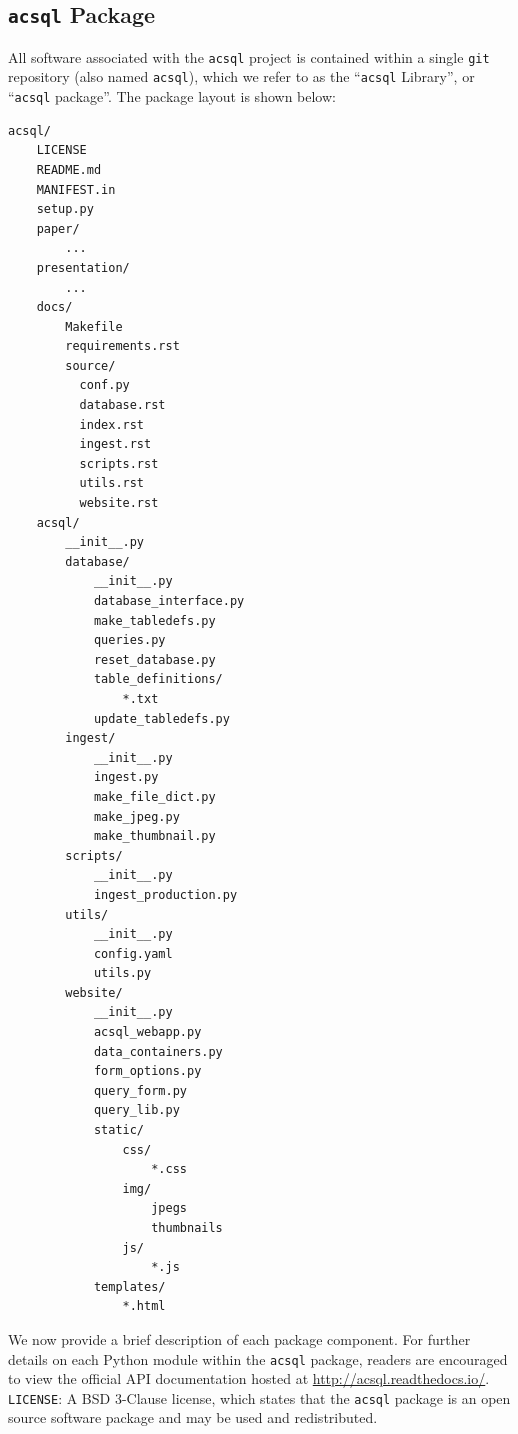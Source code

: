 \documentclass[10pt,journal,compsoc]{IEEEtran}
\begin{document}
\subsection{\texttt{acsql} Package} \label{sec3.10}

All software associated with the \texttt{acsql} project is contained within a single \texttt{git} repository (also named \texttt{acsql}), which we refer to as the ``\texttt{acsql} Library'',
or ``\texttt{acsql} package''.  The package layout is shown below:

\lstset{basicstyle=\footnotesize\ttfamily,breaklines=true}
\begin{lstlisting}
acsql/
    LICENSE
    README.md
    MANIFEST.in
    setup.py
    paper/
        ...
    presentation/
        ...
    docs/
        Makefile
        requirements.rst
        source/
          conf.py
          database.rst
          index.rst
          ingest.rst
          scripts.rst
          utils.rst
          website.rst
    acsql/
        __init__.py
        database/
            __init__.py
            database_interface.py
            make_tabledefs.py
            queries.py
            reset_database.py
            table_definitions/
                *.txt
            update_tabledefs.py
        ingest/
            __init__.py
            ingest.py
            make_file_dict.py
            make_jpeg.py
            make_thumbnail.py
        scripts/
            __init__.py
            ingest_production.py
        utils/
            __init__.py
            config.yaml
            utils.py
        website/
            __init__.py
            acsql_webapp.py
            data_containers.py
            form_options.py
            query_form.py
            query_lib.py
            static/
                css/
                    *.css
                img/
                    jpegs
                    thumbnails
                js/
                    *.js
            templates/
                *.html
\end{lstlisting}

We now provide a brief description of each package component.  For further details on each Python module within the \texttt{acsql} package, readers are encouraged to view the official API
documentation hosted at \textcolor{blue}{\url{http://acsql.readthedocs.io/}}.\\

\noindent\texttt{LICENSE}: A BSD 3-Clause license, which states that the \texttt{acsql} package is an open source software package and may be used and redistributed.\\
\end{document}
